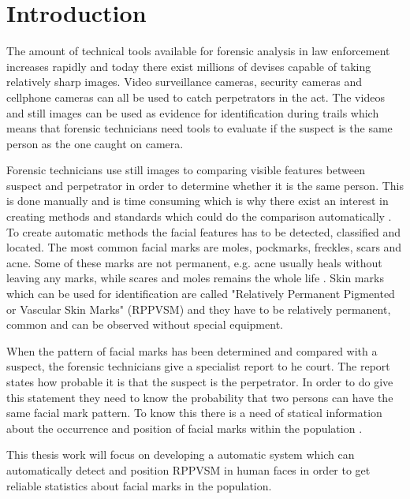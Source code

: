 \documentclass{article}
\begin{document}
\setcounter{page}{1}


\section{Introduction}

The amount of technical tools available for forensic analysis in law enforcement increases rapidly and today there exist millions of devises capable of taking relatively sharp images. Video surveillance cameras, security cameras and cellphone cameras can all be used to catch perpetrators in the act. The videos and still images can be used as evidence for identification during trails which means that forensic technicians need tools to evaluate if the suspect is the same person as the one caught on camera.

Forensic technicians use still images to comparing visible features between suspect and perpetrator in order to determine whether it is the same person. This is done manually and is time consuming which is why there exist an interest in creating methods and standards which could do the comparison automatically \cite{forensic_identification}. To create automatic methods the facial features has to be detected, classified and located. The most common facial marks are moles, pockmarks, freckles, scars and acne. Some of these marks are not permanent, e.g. acne usually heals without leaving any marks, while scares and moles remains the whole life    \cite{automatic_detector_2015}. Skin marks which can be used for identification are called "Relatively Permanent Pigmented or Vascular Skin Marks" (RPPVSM) and they have to be relatively permanent, common and can be observed without special equipment. \cite{statistic_RPPVSM}

When the pattern of facial marks has been determined and compared with a suspect, the forensic technicians give a specialist report to he court. The report states how probable it is that the suspect is the perpetrator. In order to do give this statement they need to know the probability that two persons can have the same facial mark pattern. To know this there is a need of statical information about the occurrence and position of facial marks within the population \cite{NFC_stat}.

This thesis work will focus on developing a automatic system which can automatically detect and position RPPVSM in human faces in order to get reliable statistics about facial marks in the population.   
\end{document}
